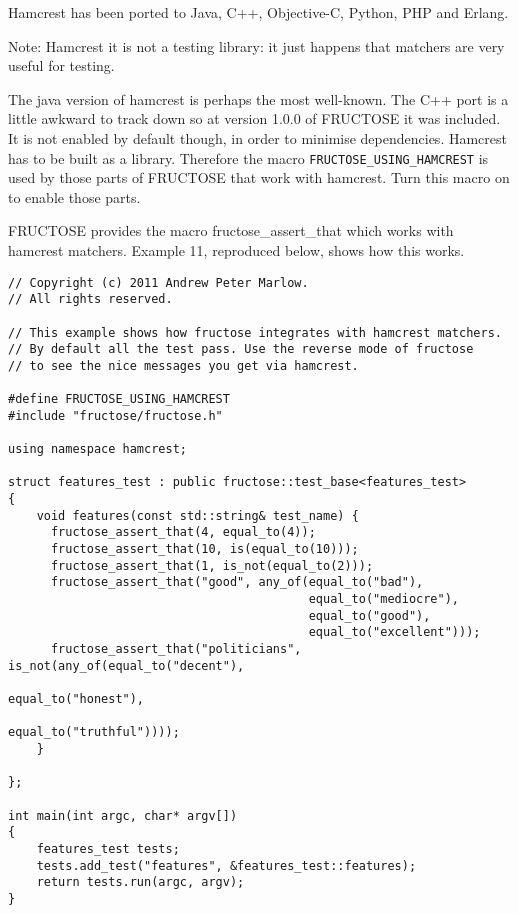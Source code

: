 \documentclass{book}
\begin{document}
Hamcrest has been ported to Java, C++, Objective-C, Python, PHP and Erlang.

Note: Hamcrest it is not a testing library: it just happens that matchers are 
very useful for testing. 

The java version of hamcrest is perhaps the most well-known.
The C++ port is a little awkward to track down so at version 1.0.0 of
FRUCTOSE it was included. It is not enabled by default though, in order
to minimise dependencies. Hamcrest has to be built as a library.
Therefore the macro {\tt FRUCTOSE\_USING\_HAMCREST} is used by those parts of
FRUCTOSE that work with hamcrest. Turn this macro on to enable those parts.

FRUCTOSE provides the macro {fructose\_assert\_that} which 
works with hamcrest matchers.
Example 11, reproduced below, shows how this works.

\begin{verbatim}
// Copyright (c) 2011 Andrew Peter Marlow.
// All rights reserved.

// This example shows how fructose integrates with hamcrest matchers.
// By default all the test pass. Use the reverse mode of fructose
// to see the nice messages you get via hamcrest.

#define FRUCTOSE_USING_HAMCREST
#include "fructose/fructose.h"

using namespace hamcrest;

struct features_test : public fructose::test_base<features_test> 
{
    void features(const std::string& test_name) {
      fructose_assert_that(4, equal_to(4));
      fructose_assert_that(10, is(equal_to(10)));
      fructose_assert_that(1, is_not(equal_to(2)));
      fructose_assert_that("good", any_of(equal_to("bad"), 
                                          equal_to("mediocre"), 
                                          equal_to("good"), 
                                          equal_to("excellent")));
      fructose_assert_that("politicians", is_not(any_of(equal_to("decent"), 
                                                        equal_to("honest"), 
                                                        equal_to("truthful"))));
    }

};

int main(int argc, char* argv[])
{
    features_test tests;
    tests.add_test("features", &features_test::features);
    return tests.run(argc, argv);
}
\end{verbatim}


\end{document}

